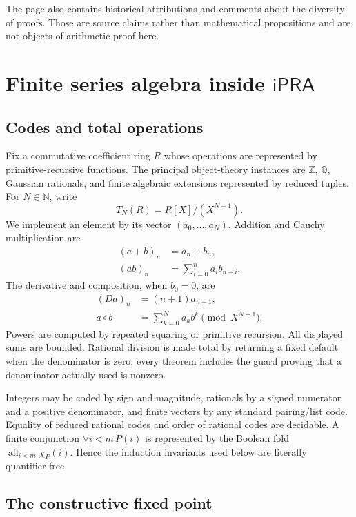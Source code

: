 \documentclass[11pt]{article}
\theoremstyle{definition}
\newcommand{\N}{\mathbb N}
\newcommand{\Z}{\mathbb Z}
\newcommand{\Q}{\mathbb Q}
\newcommand{\ipra}{\mathsf{iPRA}}
\begin{document}
The page also contains historical attributions and comments about the diversity
of proofs.  Those are source claims rather than mathematical propositions and
are not objects of arithmetic proof here.

\section{Finite series algebra inside \(\ipra\)}\label{sec:finite}

\subsection{Codes and total operations}

Fix a commutative coefficient ring \(R\) whose operations are represented by
primitive-recursive functions.  The principal object-theory instances are
\(\Z\), \(\Q\), Gaussian rationals, and finite algebraic extensions represented
by reduced tuples.  For \(N\in\N\), write
\[
 T_N(R)=R[X]/(X^{N+1}).
\]
We implement an element by its vector \((a_0,\ldots,a_N)\).  Addition and
Cauchy multiplication are
\begin{align*}
 (a+b)_n&=a_n+b_n,\\
 (ab)_n&=\sum_{i=0}^{n}a_i b_{n-i}.
\end{align*}
The derivative and composition, when \(b_0=0\), are
\begin{align*}
 (Da)_n&=(n+1)a_{n+1},\\
 a\circ b&=\sum_{k=0}^{N} a_k b^k \pmod {X^{N+1}}.
\end{align*}
Powers are computed by repeated squaring or primitive recursion.  All displayed
sums are bounded.  Rational division is made total by returning a fixed default
when the denominator is zero; every theorem includes the guard proving that a
denominator actually used is nonzero.

Integers may be coded by sign and magnitude, rationals by a signed numerator
and a positive denominator, and finite vectors by any standard pairing/list
code.  Equality of reduced rational codes and order of rational codes are
decidable.  A finite conjunction \(\forall i<m\,P(i)\) is represented by the
Boolean fold \(\operatorname{all}_{i<m}\chi_P(i)\).  Hence the induction
invariants used below are literally quantifier-free.

\subsection{The constructive fixed point}
\end{document}

